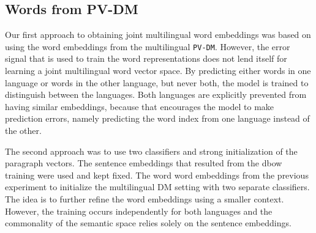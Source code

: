 
% 
% 

\subsection{Words from PV-DM}
Our first approach to obtaining joint multilingual word embeddings was based on using the word embeddings from the multilingual \texttt{PV-DM}.
However, the error signal that is used to train the word representations does not lend itself for learning a joint multilingual word vector space.
By predicting either words in one language or words in the other language, but never both, the model is trained to distinguish between the languages.
Both languages are explicitly prevented from having similar embeddings, because that encourages the model to make prediction errors, namely predicting the word index from one language instead of the other.




The second approach was to use two classifiers and strong initialization of the paragraph vectors.
The sentence embeddings that resulted from the dbow training were used and kept fixed.
The word word embeddings from the previous experiment to initialize the multilingual DM setting with two separate classifiers.
The idea is to further refine the word embeddings using a smaller context.
However, the training occurs independently for both languages and the commonality of the semantic space relies solely on the sentence embeddings.


